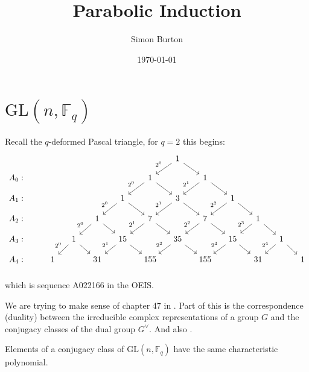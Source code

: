 \documentclass[11pt,oneside]{article}
\title{Parabolic Induction}
\author{Simon Burton}
\date{\today}
\newcommand{\GL}{\mathrm{GL}}
\newcommand{\Field}{\mathbb{F}}
\begin{document}
\maketitle

\section{$\GL(n,\Field_q)$}

Recall the $q$-deformed Pascal triangle, for $q=2$ this begins:
$$
\begin{tikzcd}[column sep=small, row sep=small]
 &  &  &  &  &  &  & 1\arrow[dl, swap, "2^0"]\arrow[dr] &  &  &  &  &  \\
A_0: &  &  &  &  &  & 1\arrow[dl, swap, "2^{0}"]\arrow[dr] &  & 1\arrow[dl, swap, "2^{1}"]\arrow[dr] &  &  &  &  \\
A_1: &  &  &  &  & 1\arrow[dl, swap, "2^{0}"]\arrow[dr] &  & 3\arrow[dl, swap, "2^{1}"]\arrow[dr] &  & 1\arrow[dl, swap, "2^{2}"]\arrow[dr] &  &  &  \\
A_2: &  &  &  & 1\arrow[dl, swap, "2^{0}"]\arrow[dr] &  & 7\arrow[dl, swap, "2^{1}"]\arrow[dr] &  & 7\arrow[dl, swap, "2^{2}"]\arrow[dr] &  & 1\arrow[dl, swap, "2^{3}"]\arrow[dr] &  &  \\
A_3: &  &  & 1\arrow[dl, swap, "2^{0}"]\arrow[dr] &  & 15\arrow[dl, swap, "2^{1}"]\arrow[dr] &  & 35\arrow[dl, swap, "2^{2}"]\arrow[dr] &  & 15\arrow[dl, swap, "2^{3}"]\arrow[dr] &  & 1\arrow[dl, swap, "2^{4}"]\arrow[dr] &  \\
A_4: &  & 1 &  & 31 &  & 155 &  & 155 &  & 31 &  & 1 \\
\end{tikzcd}
$$
which is sequence A022166 in the OEIS.


We are trying to make sense of chapter 47 in \cite{Bump2004}.
Part of this is the correspondence (duality)
between the irreducible complex
representations of a group $G$ and the conjugacy classes of the dual group $G^{\vee}$.
And also \cite{Joyal1995}.

Elements of a 
conjugacy class of $\GL(n,\Field_q)$ have the same characteristic polynomial.



\setlength{\tabcolsep}{10pt}
\setlength{\arraycolsep}{1pt}
\renewcommand{\arraystretch}{0.5}

\end{document}
